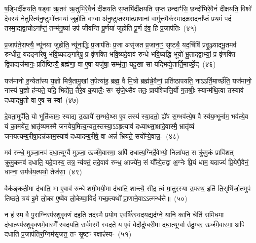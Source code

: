 {\anuvakamend[{याव॑न्तो\-ऽस्य मुख॒तश्चित्य॑स्य वर्धयत्यादि॒त्यो᳚\-ऽष्टाविꣳ॑शतिश्च}]}

ष॒ड्भिर्दी᳚क्षयति॒ षड्वा ऋ॒तव॑ ऋ॒तुभि॑रे॒वैनं॑ दीक्षयति स॒प्तभि॑र्दीक्षयति स॒प्त छन्दाꣳ॑सि॒ छन्दो॑भिरे॒वैनं॑ दीक्षयति॒ विश्वे॑ दे॒वस्य॑ ने॒तुरित्य॑नु॒ष्टुभो᳚त्त॒मया॑ जुहोति॒ वाग्वा अ॑नु॒ष्टुप्तस्मा᳚त्प्रा॒णानां॒ वागु॑त्त॒मैक॑स्माद॒क्षरा॒दना᳚प्तं प्रथ॒मं प॒दं तस्मा॒द्यद्वा॒चो\-ऽना᳚प्तं॒ तन्म॑नु॒ष्या॑ उप॑ जीवन्ति पू॒र्णया॑ जुहोति पू॒र्ण इ॑व॒ हि प्र॒जा\-प॑तिः~(४५)\ip

प्र॒जा\-प॑ते॒राप्त्यै॒ न्यू॑नया जुहोति॒ न्यू॑ना॒द्धि प्र॒जा\-प॑तिः प्र॒जा असृ॑जत प्र॒जाना॒ꣳ॒ सृष्ट्यै॒ यद॒र्चिषि॑ प्रवृ॒ञ्ज्याद्भू॒तमव॑ रुन्धीत॒ यदङ्गा॑रेषु भवि॒ष्यदङ्गा॑रेषु॒ प्र वृ॑णक्ति भवि॒ष्यदे॒वाव॑ रुन्धे भवि॒ष्यद्धि भूयो॑ भू॒ताद्द्वाभ्यां॒ प्र वृ॑णक्ति द्वि॒पाद्यज॑मानः॒ प्रति॑ष्ठित्यै॒ ब्रह्म॑णा॒ वा ए॒षा यजु॑षा॒ सम्भृ॑ता॒ यदु॒खा सा यद्भिद्ये॒तार्ति॒मार्च्छे॒द्~(४६)\ip

यज॑मानो ह॒न्येता᳚स्य य॒ज्ञो मित्रै॒तामु॒खां त॒पेत्या॑ह॒ ब्रह्म॒ वै मि॒त्रो ब्रह्म॑न्ने॒वैनां॒ प्रति॑\-ष्ठापयति॒ नाऽऽर्ति॒मार्च्छ॑ति॒ यज॑मानो॒ नास्य॑ य॒ज्ञो ह॑न्यते॒ यदि॒ भिद्ये॑त॒ तैरे॒व क॒पालैः॒ सꣳ सृ॑जे॒थ्सैव ततः॒ प्राय॑श्चित्ति॒र्यो ग॒तश्रीः॒ स्यान्म॑थि॒त्वा तस्याव॑ दध्याद्भू॒तो वा ए॒ष स स्वां~(४७)\ip

दे॒वता॒मुपै॑ति॒ यो भूति॑कामः॒ स्याद्य उ॒खायै॑ स॒म्भवे॒थ्स ए॒व तस्य॑ स्या॒दतो॒ ह्ये॑ष स॒म्भव॑त्ये॒ष वै स्व॑य॒म्भूर्नाम॒ भव॑त्ये॒व यं का॒मये॑त॒ भ्रातृ॑व्यमस्मै जनयेय॒मित्य॒न्यत॒स्तस्या॒\-ऽऽ\-हृत्याव॑ दध्याथ्सा॒क्षादे॒वास्मै॒ भ्रातृ॑व्यं जनयत्यम्ब॒रीषा॒\-दन्न॑काम॒स्याव॑ दध्यादम्ब॒रीषे॒ वा अन्नं॑ भ्रियते॒ सयो᳚न्ये॒वान्न॒-~(४८)\ip

मव॑ रुन्धे॒ मुञ्जा॒नव॑ दधा॒त्यूर्ग्वै मुञ्जा॒ ऊर्ज॑मे॒वास्मा॒ अपि॑ दधात्य॒ग्निर्दे॒वेभ्यो॒ निला॑यत॒ स क्रु॑मु॒कं प्रावि॑शत् क्रुमु॒कमव॑ दधाति॒ यदे॒वास्य॒ तत्र॒ न्य॑क्तं॒ तदे॒वाव॑ रुन्ध॒ आज्ये॑न॒ सं यौ᳚त्ये॒तद्वा अ॒ग्नेः प्रि॒यं धाम॒ यदाज्यं॑ प्रि॒येणै॒वैनं॒ धाम्ना॒ सम॑र्धय॒त्यथो॒ तेज॑सा॒~(४९)\ip

वैक॑ङ्कती॒मा द॑धाति॒ भा ए॒वाव॑ रुन्धे शमी॒मयी॒मा द॑धाति॒ शान्त्यै॒ सीद॒ त्वं मा॒तुर॒स्या उ॒पस्थ॒ इति॑ ति॒सृभि॑र्जा॒तमुप॑ तिष्ठते॒ त्रय॑ इ॒मे लो॒का ए॒ष्वे॑व लो॒केष्वा॒विदं॑ गच्छ॒त्यथो᳚ प्रा॒णाने॒वा\-ऽऽ\-त्मन्ध॑त्ते॥~(५०)\ip

{}

न ह॑ स्म॒ वै पु॒राग्निरप॑रशुवृक्णं दहति॒ तद॑स्मै प्रयो॒ग ए॒वर्\mbox{}षि॑रस्वदय॒द्यद॑ग्ने॒ यानि॒ कानि॒ चेति॑ स॒मिध॒मा द॑धा॒त्यप॑रशुवृक्णमे॒वास्मै᳚ स्वदयति॒ सर्व॑मस्मै स्वदते॒ य ए॒वं वेदौदु॑म्बरी॒मा द॑धा॒त्यूर्ग्वा उ॑दु॒म्बर॒ ऊर्ज॑मे॒वास्मा॒ अपि॑ दधाति प्र॒जा\-प॑तिर॒ग्निम॑सृजत॒ तꣳ सृ॒ष्टꣳ \mbox{रक्षाꣴ॑स्य-~(५१)\ip}

